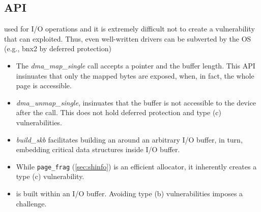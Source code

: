 \subsection{API}\label{sec:api}

\DIFdelbegin {}\DIFdelend \DIFaddbegin {}\DIFaddend used for I/O operations and \DIFdelbegin {}\DIFdelend \DIFaddbegin {}\DIFaddend it is extremely difficult not to create a \subpage{} vulnerability that can \DIFdelbegin {}\DIFdelend \DIFaddbegin {}\DIFaddend exploited. Thus, even well-written drivers can be subverted by the OS (e.g., bnx2 by deferred protection)\DIFdelbegin {}\DIFdelend \DIFaddbegin {}\DIFaddend 

    \begin{itemize}[wide, labelwidth=!, labelindent=3pt]
        \item The \textit{dma\_map\_single} call accepts a pointer and the buffer length. This API insinuates that only the mapped bytes are exposed, when, in fact, the whole page is accessible.
        \item \textit{dma\_unmap\_single}, insinuates that the buffer is not accessible to the device after the call. This does not hold \DIFdelbegin {}\DIFdelend \DIFaddbegin {}\DIFaddend deferred protection and type (c) \subpage{} vulnerabilities.
        \item \textit{build\_skb} facilitates building an \skb{} around an arbitrary I/O buffer, in turn, embedding critical data structures inside \DIFdelbegin {}\DIFdelend \DIFaddbegin {}\DIFaddend I/O buffer.
        \item While \texttt{page\_frag} (\DIFdelbegin {}\DIFdelend \DIFaddbegin {}\DIFaddend \ref{sec:shinfo}) is an efficient allocator, it inherently creates a type (c) \subpage{} vulnerability.
            \item \DIFaddbegin {}\DIFaddend \shinfo{} is \DIFdelbegin {}\DIFdelend built within an I/O buffer. Avoiding type (b) \subpage{} vulnerabilities imposes a challenge.
    \end{itemize}

